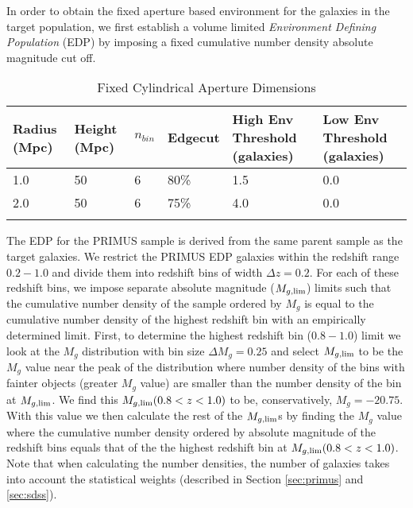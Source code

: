 \documentclass{emulateapj}
\begin{document}
In order to obtain the fixed aperture based environment for the galaxies in the target population, 
we first establish a volume limited {\it Environment Defining Population} (EDP) by imposing a fixed 
cumulative number density absolute magnitude cut off. 
\begin{table*} %
  \caption{Fixed Cylindrical Aperture Dimensions}
  \label{tab:aperture}
  \begin{center}
    \leavevmode
    \begin{tabular}{llllll} \hline \hline              
  Radius (Mpc)          &Height (Mpc)      &$n_{bin}$   &Edgecut &High Env Threshold (galaxies) &Low Env Threshold (galaxies) \\ \hline 
  1.0 &50 &6 & 80\% & 1.5 & 0.0          \\
  2.0 &50 &6 & 75\% & 4.0 & 0.0          \\ \hline
  \multicolumn{6}{l}{}                                             \\       
    \end{tabular}
  \end{center}
\end{table*}
The EDP for the PRIMUS sample is derived from the same parent sample as the target galaxies. 
We restrict the PRIMUS EDP galaxies within the redshift range $0.2-1.0$ and divide them into redshift bins of width $\Delta z = 0.2$. 
For each of these redshift bins, we impose separate absolute magnitude ($M_{g,\rm{lim}}$) limits such 
that the cumulative number density of the sample ordered by $M_{g}$ is equal to the cumulative 
number density of the highest redshift bin with an empirically determined limit. 
First, to determine the highest redshift bin ($0.8-1.0$) limit we look at the $M_{g}$ distribution with bin size
$\Delta M_{g} = 0.25$ and select $M_{g,\rm{lim}}$ to be the $M_{g}$ value near the peak of the 
distribution where number density of the bins with fainter objects (greater $M_{g}$ value) are smaller
than the number density of the bin at $M_{g, \rm{lim}}$. 
We find this $M_{g, \rm{lim}}( 0.8 < z < 1.0)$ to be, conservatively, $M_{g} = -20.75$. 
With this value we then calculate the rest of the $M_{g, \rm{lim}}$s by finding the
$M_{g}$ value where the cumulative number density ordered by absolute magnitude of the redshift bins 
equals that of the the highest redshift bin at $M_{g, \rm{lim}}( 0.8 < z < 1.0)$. 
Note that when calculating the number densities, the number of galaxies takes into account the 
statistical weights (described in Section \ref{sec:primus} and \ref{sec:sdss}).
\end{document}
